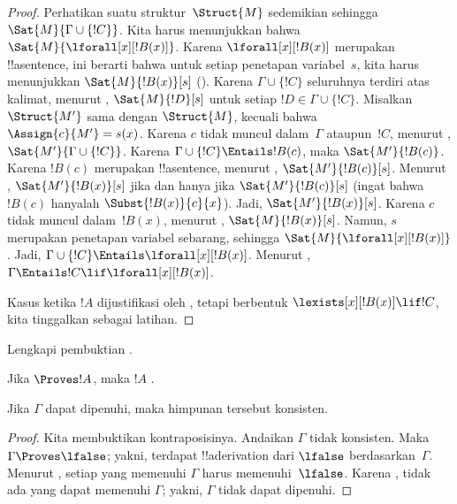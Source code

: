 \documentclass[../../../include/open-logic-section]{subfiles}
\begin{document}
\begin{proof}
{Perhatikan suatu struktur~$\Struct{M}$ sedemikian sehingga
$\Sat{M}{\Gamma \cup \{!C\}}$. Kita harus menunjukkan bahwa
$\Sat{M}{\lforall[x][!B(x)]}$. Karena $\lforall[x][!B(x)]$ merupakan
!!a{sentence}, ini berarti bahwa untuk setiap penetapan variabel~$s$,
kita harus menunjukkan $\Sat{M}{!B(x)}[s]$
(). Karena $\Gamma \cup \{!C\}$
seluruhnya terdiri atas kalimat, menurut
, $\Sat{M}{!D}[s]$ untuk setiap
$!D \in \Gamma \cup \{!C\}$. Misalkan $\Struct{M'}$ sama dengan
$\Struct{M}$, kecuali bahwa $\Assign{c}{M'} = s(x)$. Karena $c$ tidak muncul
dalam~$\Gamma$ ataupun~$!C$, menurut
,
$\Sat{M'}{\Gamma \cup \{!C\}}$. Karena
$\Gamma \cup \{!C\} \Entails !B(c)$, maka $\Sat{M'}{!B(c)}$. Karena
$!B(c)$ merupakan !!a{sentence}, menurut
, $\Sat{M'}{!B(c)}[s]$.
Menurut ,
$\Sat{M'}{!B(x)}[s]$ jika dan hanya jika $\Sat{M'}{!B(c)}[s]$
(ingat bahwa $!B(c)$ hanyalah $\Subst{!B(x)}{c}{x}$). Jadi,
$\Sat{M'}{!B(x)}[s]$. Karena $c$ tidak muncul dalam~$!B(x)$, menurut
, $\Sat{M}{!B(x)}[s]$. Namun,
$s$ merupakan penetapan variabel sebarang, sehingga
$\Sat{M}{\lforall[x][!B(x)]}$. Jadi,
$\Gamma \cup \{!C\} \Entails \lforall[x][!B(x)]$. Menurut
,
$\Gamma \Entails !C \lif \lforall[x][!B(x)]$.

Kasus ketika $!A$ dijustifikasi oleh \QR, tetapi berbentuk
$\lexists[x][!B(x)] \lif !C$, kita tinggalkan sebagai latihan.}{}
\end{proof}

\begin{prob}
  Lengkapi pembuktian .
\end{prob}
\tagendprob

\begin{cor}
Jika $\Proves !A$, maka $!A$ .
\end{cor}

\begin{cor}
Jika $\Gamma$ dapat dipenuhi, maka himpunan tersebut konsisten.
\end{cor}

\begin{proof}
Kita membuktikan kontraposisinya. Andaikan $\Gamma$ tidak konsisten.
Maka $\Gamma \Proves \lfalse$; yakni, terdapat !!a{derivation} dari
$\lfalse$ berdasarkan~$\Gamma$. Menurut , setiap
yang memenuhi $\Gamma$ harus memenuhi~$\lfalse$. Karena
, tidak ada
 yang dapat memenuhi $\Gamma$;
yakni, $\Gamma$ tidak dapat dipenuhi.
\end{proof}
\end{document}
